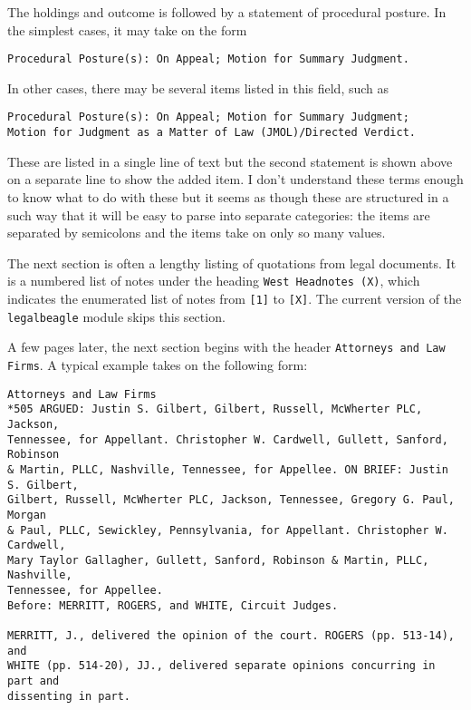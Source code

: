 \documentclass[11pt]{paper}
\begin{document}
The holdings and outcome is followed by a statement of procedural posture. 
In the simplest cases, it may take on the form
\begin{verbatim}
Procedural Posture(s): On Appeal; Motion for Summary Judgment.
\end{verbatim}
% 
In other cases, there may be several items listed in this field, such as
\begin{verbatim}
Procedural Posture(s): On Appeal; Motion for Summary Judgment; 
Motion for Judgment as a Matter of Law (JMOL)/Directed Verdict.
\end{verbatim}
% 
These are listed in a single line of text but
the second statement is shown above on a separate line to show the added item. 
I don't understand these terms enough to know what to do with these
but it seems as though these are structured in a such way that it will be easy 
to parse into separate categories: the items are separated by semicolons 
and the items take on only so many values. 


The next section is often a lengthy listing of quotations from legal documents. 
It is a numbered list of notes under the heading \texttt{West Headnotes (X)}, 
which indicates the enumerated list of notes from \texttt{[1]} to \texttt{[X]}. 
The current version of the \texttt{legalbeagle} module skips this section. 

A few pages later, the next section begins with 
the header \texttt{Attorneys and Law Firms}. 
A typical example takes on the following form:
%
\begin{verbatim}
Attorneys and Law Firms
*505 ARGUED: Justin S. Gilbert, Gilbert, Russell, McWherter PLC, Jackson, 
Tennessee, for Appellant. Christopher W. Cardwell, Gullett, Sanford, Robinson 
& Martin, PLLC, Nashville, Tennessee, for Appellee. ON BRIEF: Justin S. Gilbert, 
Gilbert, Russell, McWherter PLC, Jackson, Tennessee, Gregory G. Paul, Morgan 
& Paul, PLLC, Sewickley, Pennsylvania, for Appellant. Christopher W. Cardwell, 
Mary Taylor Gallagher, Gullett, Sanford, Robinson & Martin, PLLC, Nashville, 
Tennessee, for Appellee.
Before: MERRITT, ROGERS, and WHITE, Circuit Judges.

MERRITT, J., delivered the opinion of the court. ROGERS (pp. 513-14), and 
WHITE (pp. 514-20), JJ., delivered separate opinions concurring in part and 
dissenting in part.

\end{verbatim}
%
\end{document}
